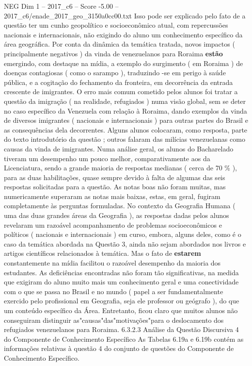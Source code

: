 \begin{textsample}{NEG Dim 1 – 2017\_c6 – Score -5.00 – 2017\_c6/enade\_2017\_geo\_3150a0cc00.txt}
Isso pode ser explicado pelo fato de a questão ter um cunho geopolítico e socioeconômico atual, com repercussões nacionais e internacionais, não exigindo do aluno um conhecimento específico da área geográfica.
Por conta da dinâmica da temática tratada, novos impactos ( principalmente negativos ) da vinda de venezuelanos para Roraima \textbf{estão} emergindo, com destaque na mídia, a exemplo do surgimento ( em Roraima ) de doenças contagiosas ( como o sarampo ), traduzindo -se em perigo à saúde pública, e a cogitação do fechamento da fronteira, em decorrência da entrada crescente de imigrantes.
O erro mais comum cometido pelos alunos foi tratar a questão da imigração ( na realidade, refugiados ) numa visão global, sem se deter no caso específico da Venezuela com relação à Roraima, dando exemplos da vinda de diversos imigrantes ( nacionais e internacionais ) para outras partes do Brasil e as consequências dela decorrentes.
Alguns alunos colocaram, como resposta, parte do texto introdutório da questão ; outros falaram das milícias venezuelanas como causas da vinda de imigrantes.
Numa análise geral, os alunos do Bacharelado tiveram um desempenho um pouco melhor, comparativamente aos da Licenciatura, sendo a grande maioria de respostas medianas ( cerca de 70 \% ), para as duas habilitações, quase sempre devido à falta de algumas das seis respostas solicitadas para a questão.
As notas boas não foram muitas, mas numericamente superaram as notas mais baixas, estas, em geral, fugiram completamente às perguntas formuladas.
No contexto da Geografia Humana ( uma das duas grandes áreas da Geografia ), as respostas dadas pelos alunos revelaram um razoável acompanhamento de problemas socioeconômicos e políticos ( nacionais e internacionais ) em curso, embora, alguns deles, como é o caso da temática abordada na Questão 3, ainda não sejam abordados nos livros e artigos científicos relacionados à temática.
Mas o fato de \textbf{estarem} constantemente na mídia facilitou o razoável desempenho da maioria dos estudantes.
As deficiências encontradas não foram tão significativas, na medida que exigiram do aluno muito mais um conhecimento geral e uma conectividade com o que se passa no Brasil e no mundo ( papel a ser fundamentalmente exercido pelo profissional em Geografia, seja ele professor ou geógrafo ), do que um conteúdo específico da Área.
Entretanto, ficou claro que muitos alunos não conseguiram distinguir as"causas"das"motivações"para o deslocamento dos refugiados venezuelanos para Roraima. 6.3.2.3 Análise da Questão Discursiva 4 do Componente de Conhecimento Específico As Tabelas 6.19a e 6.19b contém as informações relativas à questão 4 do conjunto de questões do Componente de Conhecimento Específico.

\end{textsample}
